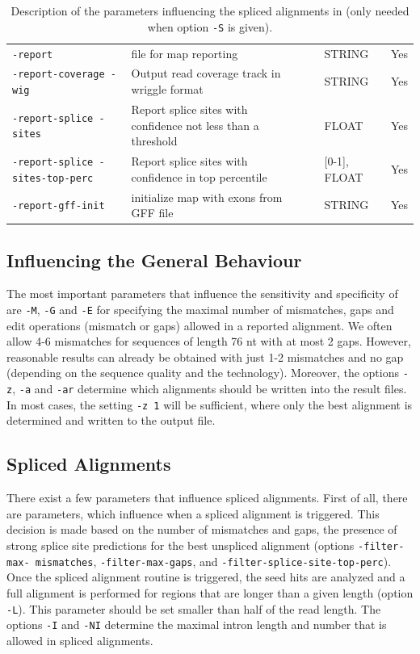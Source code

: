 \documentclass{article}
\begin{document}
\begin{table}[h!]
\begin{tabular}{p{3cm}p{6cm}clc}
  \texttt{-report}& file for map reporting&&STRING&Yes\\
\texttt{-report-coverage -wig}&Output read coverage track in wriggle
format&&STRING&Yes\\
\texttt{-report-splice -sites}&Report splice sites with confidence not less than a threshold&&  FLOAT& Yes\\
\texttt{-report-splice -sites-top-perc}&Report splice sites with
confidence in top percentile&&[0-1], FLOAT& Yes\\
 \texttt{-report-gff-init}& initialize map with exons from GFF file&&STRING&Yes\\
  \hline
\end{tabular}
\caption{Description of the parameters influencing the spliced
  alignments in \PALMapper{} (only needed when option \texttt{-S} is given).}
\label{tab:qpalma_param}
\end{table}


\subsection{Influencing the General Behaviour}
The most important parameters that influence the sensitivity and
specificity of \PALMapper{} are \texttt{-M}, \texttt{-G} and
\texttt{-E} for specifying the maximal number of mismatches, gaps and
edit operations (mismatch or gaps) allowed in a reported alignment. We
often allow 4-6 mismatches for sequences of length 76 nt with at most
2 gaps.  However, reasonable results can already be obtained with just
1-2 mismatches and no gap (depending on the sequence quality and the
technology). Moreover, the options \texttt{-z}, \texttt{-a} and
\texttt{-ar} determine which alignments should be written into the
result files. In most cases, the setting \texttt{-z 1} will be
sufficient, where only the best alignment is determined and written to
the output file.  

\subsection{Spliced Alignments} 
There exist a few parameters that influence spliced alignments. First
of all, there are parameters, which influence when a spliced alignment
is triggered. This decision is made based on the number of mismatches
and gaps, the presence of strong splice site predictions for the best
unspliced alignment (options \texttt{-filter-max- mismatches},
\texttt{-filter-max-gaps}, and
\texttt{-filter-splice-site-top-perc}). Once the spliced alignment
routine is  triggered, the seed hits are analyzed and a full alignment
is performed for regions that are longer than a given length (option 
\texttt{-L}). This parameter should be set smaller than half of the
read length. The options \texttt{-I} and \texttt{-NI} determine the
maximal intron length and number that is allowed in spliced
alignments.  
\end{document}

